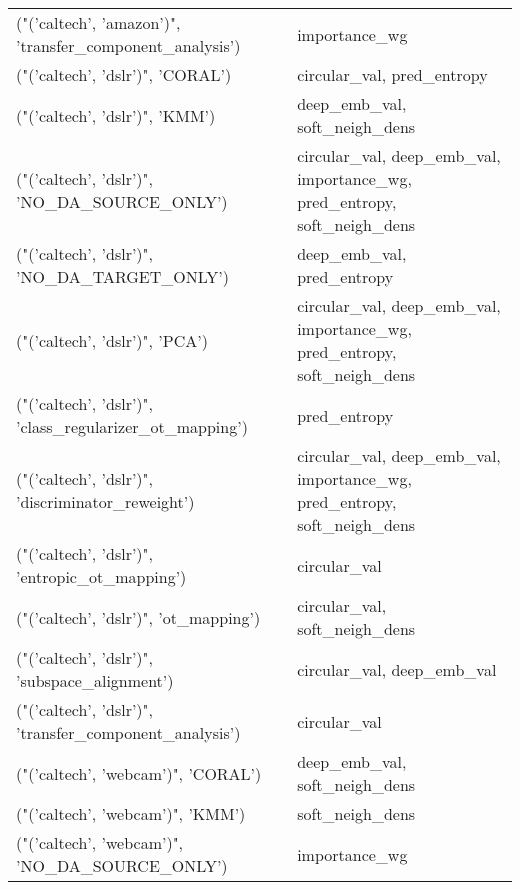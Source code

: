 \begin{tabular}{ll}
 ("('caltech', 'amazon')", 'transfer\_component\_analysis')  & importance\_wg                                                            \\
 ("('caltech', 'dslr')", 'CORAL')                          & circular\_val, pred\_entropy                                               \\
 ("('caltech', 'dslr')", 'KMM')                            & deep\_emb\_val, soft\_neigh\_dens                                            \\
 ("('caltech', 'dslr')", 'NO\_DA\_SOURCE\_ONLY')              & circular\_val, deep\_emb\_val, importance\_wg, pred\_entropy, soft\_neigh\_dens \\
 ("('caltech', 'dslr')", 'NO\_DA\_TARGET\_ONLY')              & deep\_emb\_val, pred\_entropy                                               \\
 ("('caltech', 'dslr')", 'PCA')                            & circular\_val, deep\_emb\_val, importance\_wg, pred\_entropy, soft\_neigh\_dens \\
 ("('caltech', 'dslr')", 'class\_regularizer\_ot\_mapping')   & pred\_entropy                                                             \\
 ("('caltech', 'dslr')", 'discriminator\_reweight')         & circular\_val, deep\_emb\_val, importance\_wg, pred\_entropy, soft\_neigh\_dens \\
 ("('caltech', 'dslr')", 'entropic\_ot\_mapping')            & circular\_val                                                             \\
 ("('caltech', 'dslr')", 'ot\_mapping')                     & circular\_val, soft\_neigh\_dens                                            \\
 ("('caltech', 'dslr')", 'subspace\_alignment')             & circular\_val, deep\_emb\_val                                               \\
 ("('caltech', 'dslr')", 'transfer\_component\_analysis')    & circular\_val                                                             \\
 ("('caltech', 'webcam')", 'CORAL')                        & deep\_emb\_val, soft\_neigh\_dens                                            \\
 ("('caltech', 'webcam')", 'KMM')                          & soft\_neigh\_dens                                                          \\
 ("('caltech', 'webcam')", 'NO\_DA\_SOURCE\_ONLY')            & importance\_wg                                                            \\

\end{tabular}

